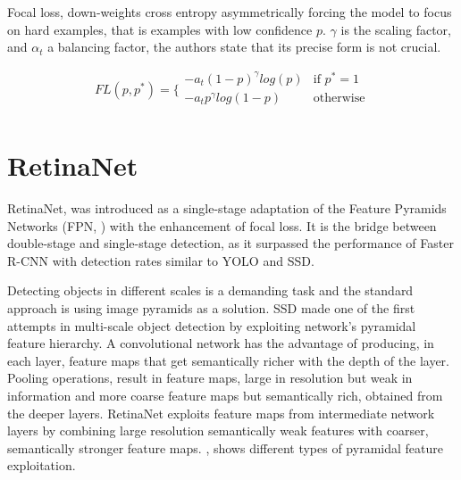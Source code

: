 Focal loss, down-weights cross entropy asymmetrically forcing the model to focus on hard examples, that is examples with low confidence $p$. $\gamma$ is the scaling factor, and $\alpha_t$ a balancing factor, the authors state that its precise form is not crucial.

\begin{equation}
    FL(p,p^*)= \bigg\{
    \begin{array}{ll}
      -a_t(1-p)^\gamma log(p) & \text{if } p^*=1 \\
      -a_tp^\gamma log(1-p) &  \text{otherwise}\\
    \end{array}
\end{equation}

\section{RetinaNet}
RetinaNet, was introduced as a single-stage adaptation of the Feature Pyramids Networks (FPN, \cite{lin2017feature}) with the enhancement of focal loss. It is the bridge between double-stage and single-stage detection, as it surpassed the performance of Faster R-CNN with detection rates similar to YOLO and SSD.

Detecting objects in different scales is a demanding task and the standard approach is using image pyramids as a solution. SSD made one of the first attempts in multi-scale object detection by exploiting network's pyramidal feature hierarchy. A convolutional network has the advantage of producing, in each layer, feature maps that get semantically richer with the depth of the layer. Pooling operations, result in feature maps, large in resolution but weak in information and more coarse feature maps but semantically rich, obtained from the deeper layers. RetinaNet exploits feature maps from intermediate network layers by combining large resolution semantically weak features with coarser, semantically stronger feature maps. , shows different types of pyramidal feature exploitation.

